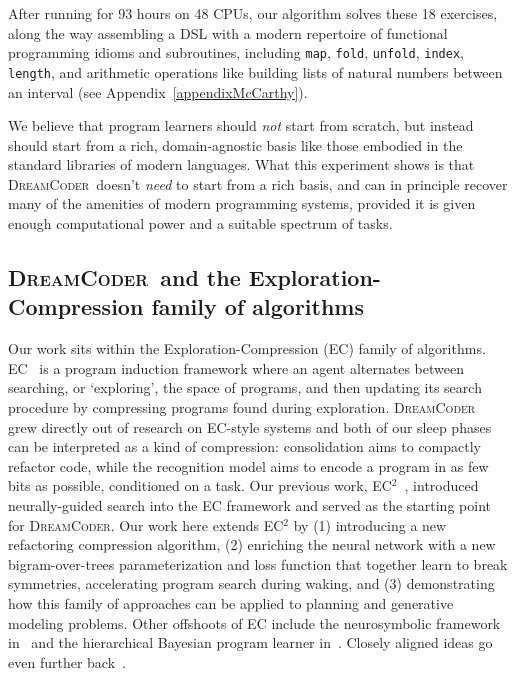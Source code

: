 \documentclass{article}
\newcommand{\system}{\textsc{DreamCoder}~}
\newcommand{\systemEnding}{\textsc{DreamCoder}}
\newcommand{\code}[1]{{\footnotesize\texttt{#1}}}
\begin{document}
After running for 93 hours on 48 CPUs, our
algorithm solves these 18 exercises, along the way assembling a DSL
with a modern repertoire of
functional programming idioms and subroutines, including \code{map},
\code{fold}, \code{unfold}, \code{index}, \code{length},
and  arithmetic operations like 
building lists of natural numbers between an interval (see  Appendix~\ref{appendixMcCarthy}).

We believe that program learners should \emph{not}
start from scratch,
but instead should start from
a rich, domain-agnostic
basis like those embodied in the standard libraries of modern  languages.
What this experiment shows is that \system doesn't \emph{need} to start from a rich basis,
and can in principle recover many of the amenities of modern programming systems,
provided it is given enough computational power and a suitable
spectrum of tasks.

\subsection{\system and the Exploration-Compression family of algorithms}

Our work sits within the Exploration-Compression (EC) family of
algorithms.  EC~\cite{Dechter:2013:BLV:2540128.2540316} is a program
induction framework where an agent alternates between searching, or
`exploring', the space of programs, and then updating its search
procedure by compressing programs found during exploration. \system
grew directly out of research on EC-style systems and both of our
sleep phases can be interpreted as a kind of compression:
consolidation aims to compactly refactor code, while the recognition
model aims to encode a program in as few bits as possible, conditioned
on a task. Our previous work, EC$^2$~\cite{ecc}, introduced
neurally-guided search into the EC framework and served as the
starting point for \systemEnding.  Our work here extends EC$^2$ by (1)
introducing a new refactoring compression algorithm, (2) enriching the
neural network with a new bigram-over-trees parameterization and loss
function that together learn to break symmetries, accelerating program
search during waking, and (3) demonstrating how this family of
approaches can be applied to planning and generative modeling
problems.  Other offshoots of EC include the neurosymbolic framework
in~\cite{lazaro2019beyond} and the hierarchical Bayesian program
learner in~\cite{DBLP:conf/icml/LiangJK10}. Closely aligned ideas go
even further back~\cite{solomonoff1989system,schmidhuber2004optimal}.
\end{document}
